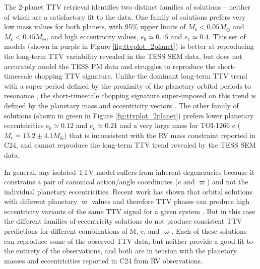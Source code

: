 \documentclass[twocolumn]{aastex631}
\begin{document}
The 2-planet TTV retrieval identifies two distinct families of solutions -- neither of which are a satisfactory fit to the data. One family of solutions prefers very low mass values for both planets, with 95\% upper limits of $M_b < 0.05 M_{\oplus}$ and $M_c < 0.45 M_{\oplus}$, and high eccentricity values, $e_b \simeq 0.15$ and $e_c \simeq 0.4$. This set of models (shown in purple in Figure \ref{fig:ttvplot_2planet}) is better at reproducing the long-term TTV variability revealed in the TESS SEM data, but does not accurately model the TESS PM data and struggles to reproduce the short-timescale chopping TTV signature. Unlike the dominant long-term TTV trend with a super-period defined by the proximity of the planetary orbital periods to resonance \citep{Lithwick_2012}, the short-timescale chopping signature super-imposed on this trend is defined by the planetary mass and eccentricity vectors \citep{Deck_2015}. The other family of solutions (shown in green in Figure  \ref{fig:ttvplot_2planet}) prefers lower planetary eccentricities $e_b \simeq 0.12$ and $e_c \simeq 0.21$ and a very large mass for TOI-1266 c ($M_c = 13.2 \pm 4.1 M_{\oplus}$) that is inconsistent with the RV mass constraint reported in C24, and cannot reproduce the long-term TTV trend revealed by the TESS SEM data. 

In general, any isolated TTV model suffers from inherent degeneracies because it constrains a pair of canonical action/angle coordinates ($e$ and $\varpi$) and not the individual planetary eccentricities. Recent work has shown that orbital solutions with different planetary $\varpi$ values and therefore TTV phases can produce high eccentricity variants of the same TTV signal for a given system \citep{Goldberg2023,Choksi2024}. But in this case the different families of eccentricity solutions do not produce consistent TTV predictions for different combinations of M, e, and $\varpi$. Each of these solutions can reproduce some of the observed TTV data, but neither provide a good fit to the entirety of the observations, and both are in tension with the planetary masses and eccentricities reported in C24 from RV observations.
\end{document}

